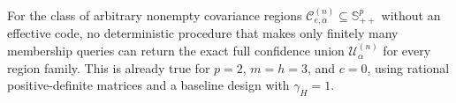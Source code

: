 For the class of arbitrary nonempty covariance regions \(\mathcal C^{(n)}_{e,\alpha}\subseteq\mathbb S_{++}^p\) without an effective code, no deterministic procedure that makes only finitely many membership queries can return the exact full confidence union \(\mathcal U^{(n)}_\alpha\) for every region family.  This is already true for \(p=2\), \(m=h=3\), and \(c=0\), using rational positive-definite matrices and a baseline design with \(\gamma_H=1\).